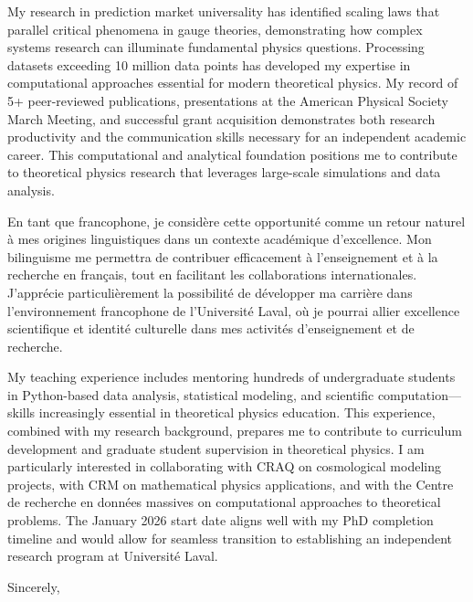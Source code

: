 \hspace{1.5em} My research in prediction market universality has identified scaling laws that parallel critical phenomena in gauge theories, demonstrating how complex systems research can illuminate fundamental physics questions. Processing datasets exceeding 10 million data points has developed my expertise in computational approaches essential for modern theoretical physics. My record of 5+ peer-reviewed publications, presentations at the American Physical Society March Meeting, and successful grant acquisition demonstrates both research productivity and the communication skills necessary for an independent academic career. This computational and analytical foundation positions me to contribute to theoretical physics research that leverages large-scale simulations and data analysis.
\vspace{1.0em}

\hspace{1.5em} En tant que francophone, je considère cette opportunité comme un retour naturel à mes origines linguistiques dans un contexte académique d'excellence. Mon bilinguisme me permettra de contribuer efficacement à l'enseignement et à la recherche en français, tout en facilitant les collaborations internationales. J'apprécie particulièrement la possibilité de développer ma carrière dans l'environnement francophone de l'Université Laval, où je pourrai allier excellence scientifique et identité culturelle dans mes activités d'enseignement et de recherche.
\vspace{1.0em}

\hspace{1.5em} My teaching experience includes mentoring hundreds of undergraduate students in Python-based data analysis, statistical modeling, and scientific computation—skills increasingly essential in theoretical physics education. This experience, combined with my research background, prepares me to contribute to curriculum development and graduate student supervision in theoretical physics. I am particularly interested in collaborating with CRAQ on cosmological modeling projects, with CRM on mathematical physics applications, and with the Centre de recherche en données massives on computational approaches to theoretical problems. The January 2026 start date aligns well with my PhD completion timeline and would allow for seamless transition to establishing an independent research program at Université Laval.
\vspace{1.0em}

Sincerely,\\
\myName\\[1.0em]

